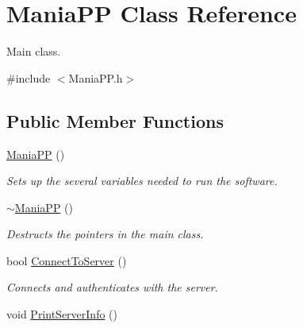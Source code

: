 \hypertarget{classManiaPP}{\section{Mania\-P\-P Class Reference}
\label{classManiaPP}
}


Main class.  




{\ttfamily \#include $<$Mania\-P\-P.\-h$>$}

\subsection*{Public Member Functions}
\begin{DoxyCompactItemize}
\item 
\hypertarget{classManiaPP_ae56f6623dc89f2c0b75bec631cfc2d19}{\hyperlink{classManiaPP_ae56f6623dc89f2c0b75bec631cfc2d19}{Mania\-P\-P} ()}\label{classManiaPP_ae56f6623dc89f2c0b75bec631cfc2d19}

\begin{DoxyCompactList}\small\item\em Sets up the several variables needed to run the software. \end{DoxyCompactList}\item 
\hypertarget{classManiaPP_a1c78c3b51db550609011fb6fdcb26ec8}{\hyperlink{classManiaPP_a1c78c3b51db550609011fb6fdcb26ec8}{$\sim$\-Mania\-P\-P} ()}\label{classManiaPP_a1c78c3b51db550609011fb6fdcb26ec8}

\begin{DoxyCompactList}\small\item\em Destructs the pointers in the main class. \end{DoxyCompactList}\item 
\hypertarget{classManiaPP_a22561171876e54dbf633c70d9924c06a}{bool \hyperlink{classManiaPP_a22561171876e54dbf633c70d9924c06a}{Connect\-To\-Server} ()}\label{classManiaPP_a22561171876e54dbf633c70d9924c06a}

\begin{DoxyCompactList}\small\item\em Connects and authenticates with the server. \end{DoxyCompactList}\item 
\hypertarget{classManiaPP_a56d2774a29f21b3a164ae1f7ea6bd88b}{void \hyperlink{classManiaPP_a56d2774a29f21b3a164ae1f7ea6bd88b}{Print\-Server\-Info} ()}\label{classManiaPP_a56d2774a29f21b3a164ae1f7ea6bd88b}


\end{DoxyCompactItemize}
